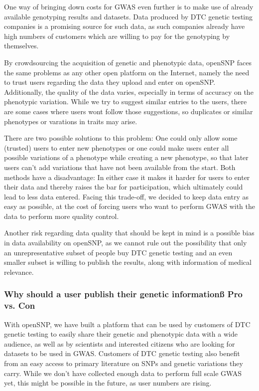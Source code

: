 \documentclass[10pt]{article}
\begin{document}
One way of bringing down costs for GWAS even further is to make use of already available genotyping results and datasets. Data produced by DTC genetic testing companies is a promising source for such data, as such companies already have high numbers of customers which are willing to pay for the genotyping by themselves.

By crowdsourcing the acquisition of genetic and phenotypic data, openSNP faces the same problems as any other open platform on the Internet, namely the need to trust users regarding the data they upload and enter on openSNP. Additionally, the quality of the data varies, especially in terms of accuracy on the phenotypic variation. While we try to suggest similar entries to the users, there are some cases where users wont follow those suggestions, so duplicates or similar phenotypes or varations in traits may arise. 

There are two possible solutions to this problem: One could only allow some (trusted) users to enter new phenotypes or one could make users enter all possible variations of a phenotype while creating a new phenotype, so that later users can't add variations that have not been available from the start. Both methods have a disadvantage: In either case it makes it harder for users to enter their data and thereby raises the bar for participation, which ultimately could lead to less data entered. Facing this trade-off, we decided to keep data entry as easy as possible, at the cost of forcing users who want to perform GWAS with the data to perform more quality control.

Another risk regarding data quality that should be kept in mind is a possible bias in data availability on openSNP, as we cannot rule out the possibility that only an unrepresentative subset of people buy DTC genetic testing and an even smaller subset is willing to publish the results, along with information of medical relevance.
\subsubsection*{Why should a user publish their genetic informationß Pro vs. Con}
With openSNP, we have built a platform that can be used by customers of DTC genetic testing to easily share their genetic and phenotypic data with a wide audience, as well as by scientists and interested citizens who are looking for datasets to be used in GWAS. Customers of DTC genetic testing also benefit from an easy access to primary literature on SNPs and genetic variations they carry. While we don't have collected enough data to perform full scale GWAS yet, this might be possible in the future, as user numbers are rising. 
\end{document}
